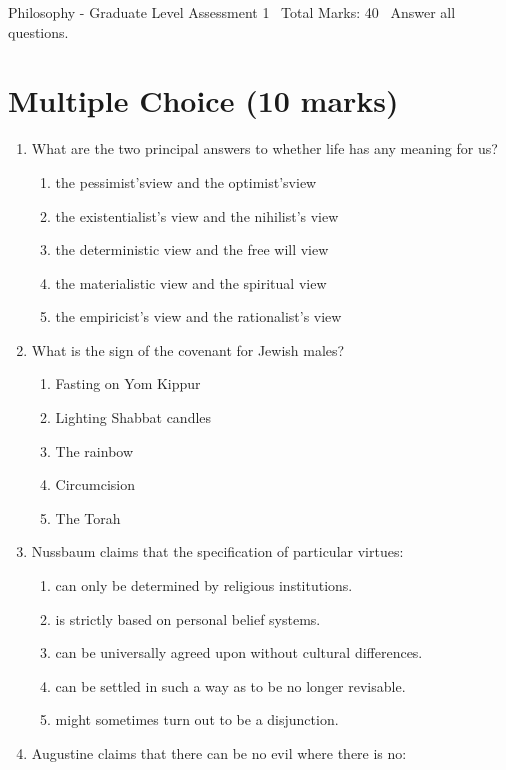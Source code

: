 \documentclass[12pt]{article}
\begin{document}
\begin{center}
Philosophy - Graduate Level Assessment 1 \
Total Marks: 40 \
Answer all questions.
\end{center}

\section*{Multiple Choice (10 marks)}
\begin{enumerate}[label=\arabic*.]
\item What are the two principal answers to whether life has any meaning for us?
\begin{enumerate}[label=(\alph*)]
    \item the pessimist'sview and the optimist'sview
    \item the existentialist's view and the nihilist's view
    \item the deterministic view and the free will view
    \item the materialistic view and the spiritual view
    \item the empiricist's view and the rationalist's view
\end{enumerate}
\item What is the sign of the covenant for Jewish males?
\begin{enumerate}[label=(\alph*)]
    \item Fasting on Yom Kippur
    \item Lighting Shabbat candles
    \item The rainbow
    \item Circumcision
    \item The Torah
\end{enumerate}
\item Nussbaum claims that the specification of particular virtues:
\begin{enumerate}[label=(\alph*)]
    \item can only be determined by religious institutions.
    \item is strictly based on personal belief systems.
    \item can be universally agreed upon without cultural differences.
    \item can be settled in such a way as to be no longer revisable.
    \item might sometimes turn out to be a disjunction.
\end{enumerate}
\item Augustine claims that there can be no evil where there is no:

\end{enumerate}
\end{document}
